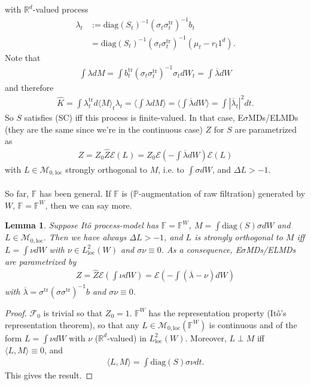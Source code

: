 \documentclass[12pt,a4paper, twoside]{article}
\newtheorem{lem}{Lemma}[section]
\theoremstyle{definition}
\newcommand{\PP}{\mathbb{P}} %
\begin{document}
with $\mathbb{R}^d$-valued process 
\begin{align*}
\lambda_t &:= \text{diag}(S_t)^{-1}( \sigma_t \sigma_t^\text{tr})^{-1} b_t \\
&= \text{diag}(S_t)^{-1} ( \sigma_t \sigma_t^\text{tr})^{-1}( \mu_t-r_t1^d).
\end{align*}
Note that 
\begin{align*}
\int \lambda dM = \int b_t^\text{tr}(\sigma_t\sigma_t^\text{tr})^{-1} \sigma_t dW_t = \int \overline{\lambda}dW
\end{align*}
and therefore 
\begin{align*}
\hat{K}= \int \lambda_t^\text{tr} d \langle M \rangle_t \lambda_t = \langle \int \lambda dM \rangle = \langle \int \overline{\lambda} dW \rangle  = \int | \overline{\lambda}_t|^2 dt.
\end{align*}
So $S$ satisfies (SC) iff this process is finite-valued. In that case, E$\sigma$MDs/ELMDs (they are the same since we're in the continuous case) $Z$ for $S$ are parametrized as 
\begin{align*}
Z = Z_0 \hat{Z} \mathcal{E}(L) = Z_0 \mathcal{E} \left( - \int \overline{\lambda}dW \right) \mathcal{E}(L)
\end{align*}
with $L \in \mathcal{M}_{0, \text{loc}}$ strongly orthogonal to $M$, i.e. to $\int \sigma dW$, and $\Delta L >-1$. 
\\\\
So far, $\mathbb{F}$ has been general. If $\mathbb{F}$ is ($\PP$-augmentation of raw filtration) generated by $W$, $\mathbb{F}= \mathbb{F}^W$, then we can say more. 
\begin{lem} \label{L54} Suppose Itô process-model has $\mathbb{F}= \mathbb{F}^W$, $M = \int \text{diag}(S) \sigma dW$ and $L \in \mathcal{M}_{0, \text{loc}}$. Then we have always $\Delta L >-1$, and $L$ is strongly orthogonal to $M$ iff $L = \int \nu dW$ with $\nu \in L_\text{loc}^2(W)$ and $\sigma \nu \equiv 0$. As a consequence, E$\sigma$MDs/ELMDs are parametrized by
\begin{align*}
Z = \hat{Z} \mathcal{E}\left( \int \nu dW \right) = \mathcal{E}\left( - \int ( \overline{\lambda}- \nu) dW \right)
\end{align*}
with $\overline{\lambda}= \sigma^\text{tr}( \sigma \sigma^\text{tr})^{-1} b$ and $\sigma \nu \equiv 0$. 
\end{lem}
\newpage
\begin{proof}
$\mathcal{F}_0$ is trivial so that $Z_0=1$. $\mathbb{F}^W$ has the representation property (Itô's representation theorem), so that any $L \in \mathcal{M}_{0, \text{loc}}( \mathbb{F}^W)$ is continuous and of the form $L = \int \nu dW$ with $\nu$ ($\mathbb{R}^d$-valued) in $L_\text{loc}^2(W)$. Moreover, $L \perp M$ iff $\langle L, M \rangle \equiv 0$, and 
\begin{align*}
\langle L, M \rangle = \int \text{diag} (S) \sigma \nu dt.
\end{align*}
This gives the result. 
\end{proof}
\end{document}
